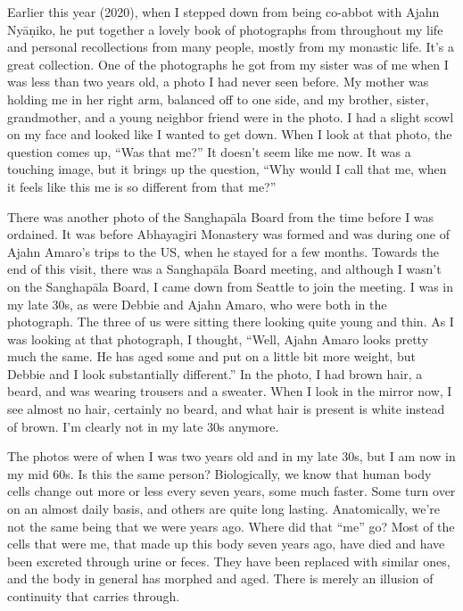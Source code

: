Earlier this year (2020), when I stepped down from being co-abbot with Ajahn Nyāṇiko, he put together a lovely book of photographs from throughout my life and personal recollections from many people, mostly from my monastic life. It's a great collection. One of the photographs he got from my sister was of me when I was less than two years old, a photo I had never seen before. My mother was holding me in her right arm, balanced off to one side, and my brother, sister, grandmother, and a young neighbor friend were in the photo. I had a slight scowl on my face and looked like I wanted to get down. When I look at that photo, the question comes up, ``Was that me?'' It doesn't seem like me now. It was a touching image, but it brings up the question, ``Why would I call that me, when it feels like this me is so different from that me?''

There was another photo of the Sanghapāla Board from the time before I was ordained. It was before Abhayagiri Monastery was formed and was during one of Ajahn Amaro's trips to the US, when he stayed for a few months. Towards the end of this visit, there was a Sanghapāla Board meeting, and although I wasn't on the Sanghapāla Board, I came down from Seattle to join the meeting. I was in my late 30s, as were Debbie and Ajahn Amaro, who were both in the photograph. The three of us were sitting there looking quite young and thin. As I was looking at that photograph, I thought, ``Well, Ajahn Amaro looks pretty much the same. He has aged some and put on a little bit more weight, but Debbie and I look substantially different.'' In the photo, I had brown hair, a beard, and was wearing trousers and a sweater. When I look in the mirror now, I see almost no hair, certainly no beard, and what hair is present is white instead of brown. I'm clearly not in my late 30s anymore.

The photos were of when I was two years old and in my late 30s, but I am now in my mid 60s. Is this the same person? Biologically, we know that human body cells change out more or less every seven years, some much faster. Some turn over on an almost daily basis, and others are quite long lasting. Anatomically, we're not the same being that we were years ago. Where did that ``me'' go? Most of the cells that were me, that made up this body seven years ago, have died and have been excreted through urine or feces. They have been replaced with similar ones, and the body in general has morphed and aged. There is merely an illusion of continuity that carries through.

